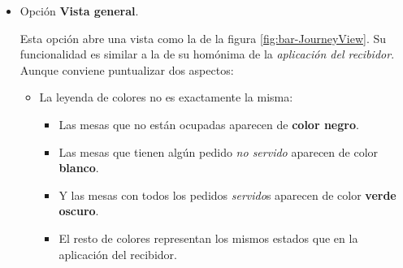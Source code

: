 \begin{itemize}
\begin{itemize}
La lista de pedidos que aparece en la opción \emph{Ver pedidos} se actualiza
automáticamente.

\item Para eliminar alguno de los pedidos de la lista de \emph{Ver pedidos}, se 
utilizará la opción \emph{Eliminar pedido}, después de seleccionar dicho
pedido.

\item La tercera opción es \emph{Editar pedido}. Para modificar alguno de los
parámetros de un pedido: primero, se seleccionará dicho pedido; y después, se
hará click sobre esta opción. A continuación, aparece una ventana emergente
como la que muestra la figura \ref{fig:bar-JourneyEditOrder}.

  \begin{figure}[H]
    \begin{center}
      \texttt{[image: bar-JourneyEditOrder.png]}
      \caption{Ventana emergente de edición de pedidos.}
      \label{fig:bar-JourneyEditOrder}
    \end{center}
  \end{figure}

Esta ventana permite modificar la cantidad de productos de ese tipo, la mesa
de destino o el estado del pedido. Para confirmar el cambio se pulsará
\emph{Aceptar}.
\end{itemize}

\item Opción \textbf{Vista general}.

Esta opción abre una vista como la de la figura \ref{fig:bar-JourneyView}.
Su funcionalidad es similar a la de su homónima de la \emph{aplicación del 
recibidor}. Aunque conviene puntualizar dos aspectos:

\begin{itemize}
\item La leyenda de colores no es exactamente la misma:
  \begin{itemize}
  \item Las mesas que no están ocupadas aparecen de \textbf{color negro}.
  \item Las mesas que tienen algún pedido \emph{no servido} aparecen de color
  \textbf{blanco}.
  \item Y las mesas con todos los pedidos \emph{servido}s aparecen de color
  \textbf{verde oscuro}.
  \item El resto de colores representan los mismos estados que en la aplicación
  del recibidor.  
  \end{itemize}


\end{itemize}
\end{itemize}
